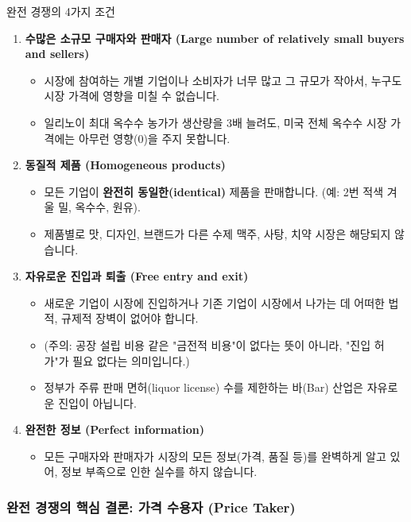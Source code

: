\documentclass[11pt,a4paper]{book}
\theoremstyle{definition}
\begin{document}
\begin{mybox}{완전 경쟁의 4가지 조건}
\begin{enumerate}
    \item \textbf{수많은 소규모 구매자와 판매자 (Large number of relatively small buyers and sellers)}
    \begin{itemize}
        \item 시장에 참여하는 개별 기업이나 소비자가 너무 많고 그 규모가 작아서, 누구도 시장 가격에 영향을 미칠 수 없습니다.
        \item [예시 👍] 일리노이 최대 옥수수 농가가 생산량을 3배 늘려도, 미국 전체 옥수수 시장 가격에는 아무런 영향(0)을 주지 못합니다.
    \end{itemize}
    \item \textbf{동질적 제품 (Homogeneous products)}
    \begin{itemize}
        \item 모든 기업이 \textbf{완전히 동일한(identical)} 제품을 판매합니다. (예: 2번 적색 겨울 밀, 옥수수, 원유).
        \item [나쁜 예 👎] 제품별로 맛, 디자인, 브랜드가 다른 수제 맥주, 사탕, 치약 시장은 해당되지 않습니다.
    \end{itemize}
    \item \textbf{자유로운 진입과 퇴출 (Free entry and exit)}
    \begin{itemize}
        \item 새로운 기업이 시장에 진입하거나 기존 기업이 시장에서 나가는 데 어떠한 법적, 규제적 장벽이 없어야 합니다.
        \item (주의: 공장 설립 비용 같은 "금전적 비용"이 없다는 뜻이 아니라, "진입 허가"가 필요 없다는 의미입니다.)
        \item [나쁜 예 👎] 정부가 주류 판매 면허(liquor license) 수를 제한하는 바(Bar) 산업은 자유로운 진입이 아닙니다.
    \end{itemize}
    \item \textbf{완전한 정보 (Perfect information)}
    \begin{itemize}
        \item 모든 구매자와 판매자가 시장의 모든 정보(가격, 품질 등)를 완벽하게 알고 있어, 정보 부족으로 인한 실수를 하지 않습니다.
    \end{itemize}
\end{enumerate}
\end{mybox}

\subsubsection{완전 경쟁의 핵심 결론: 가격 수용자 (Price Taker)}
\end{document}
